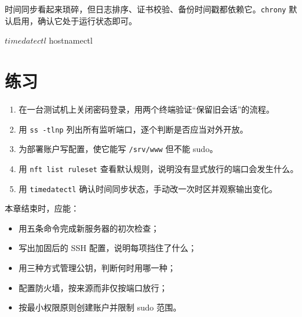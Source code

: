 时间同步看起来琐碎，但日志排序、证书校验、备份时间戳都依赖它。\texttt{chrony} 默认启用，确认它处于运行状态即可。

\begin{shellsession}
$ timedatectl
$ hostnamectl
\end{shellsession}

\section{练习}

\begin{enumerate}
  \item 在一台测试机上关闭密码登录，用两个终端验证“保留旧会话”的流程。
  \item 用 \texttt{ss -tlnp} 列出所有监听端口，逐个判断是否应当对外开放。
  \item 为部署账户写配置，使它能写 \texttt{/srv/www} 但不能 sudo。
  \item 用 \texttt{nft list ruleset} 查看默认规则，说明没有显式放行的端口会发生什么。
  \item 用 \texttt{timedatectl} 确认时间同步状态，手动改一次时区并观察输出变化。
\end{enumerate}

\begin{checkpoint}
本章结束时，应能：
\begin{itemize}
  \item 用五条命令完成新服务器的初次检查；
  \item 写出加固后的 SSH 配置，说明每项挡住了什么；
  \item 用三种方式管理公钥，判断何时用哪一种；
  \item 配置防火墙，按来源而非仅按端口放行；
  \item 按最小权限原则创建账户并限制 sudo 范围。
\end{itemize}
\end{checkpoint}
